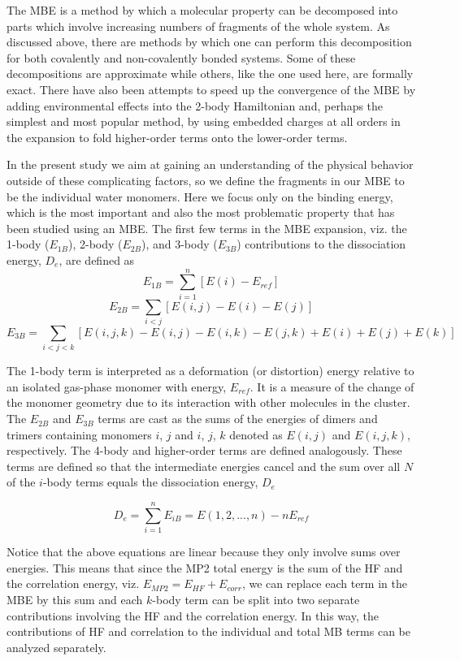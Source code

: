 \documentclass[11pt, proquest]{uwthesis}[2020/02/24]
\begin{document}
\par The MBE is a method by which a molecular property can be decomposed into parts which involve increasing numbers of fragments of the whole system. As discussed above, there are methods by which one can perform this decomposition for both covalently and non-covalently bonded systems. Some of these decompositions are approximate while others, like the one used here, are formally exact. There have also been attempts to speed up the convergence of the MBE by adding environmental effects into the 2-body Hamiltonian\autocite{gordon_effective_2001} and, perhaps the simplest and most popular method, by using embedded charges at all orders in the expansion to fold higher-order terms onto the lower-order terms.\autocite{dahlke_electrostatically_2007}

\par In the present study we aim at gaining an understanding of the physical behavior outside of these complicating factors, so we define the fragments in our MBE to be the individual water monomers. Here we focus only on the binding energy, which is the most important and also the most problematic property that has been studied using an MBE. The first few terms in the MBE expansion, viz. the 1-body ($E_{1B}$), 2-body ($E_{2B}$), and 3-body ($E_{3B}$) contributions to the dissociation energy, $D_e$, are defined as\autocite{hankins_hydrogen-bond_1970, xantheas_ab_1994}
$$
E_{1B}=\sum_{i=1}^n[E(i)-E_{ref}]
$$
$$
E_{2B}=\sum_{i<j}[E(i,j)-E(i)-E(j)]
$$
$$
E_{3B}=\sum_{i<j<k}[E(i,j,k)-E(i,j)-E(i,k)-E(j,k)+E(i)+E(j)+E(k)]
$$

The 1-body term is interpreted as a deformation (or distortion) energy\autocite{white_analysis_1990, xantheas_importance_1996} relative to an isolated gas-phase monomer with energy, $E_{ref}$. It is a measure of the change of the monomer geometry due to its interaction with other molecules in the cluster. The $E_{2B}$ and $E_{3B}$ terms are cast as the sums of the energies of dimers and trimers containing monomers $i$, $j$ and $i$, $j$, $k$ denoted as $E(i,j)$ and $E(i,j,k)$, respectively. The 4-body and higher-order terms are defined analogously. These terms are defined so that the intermediate energies cancel and the sum over all $N$ of the $i$-body terms equals the dissociation energy, $D_e$

$$
D_e=\sum_{i=1}^nE_{iB}=E(1,2,...,n)-nE_{ref}
$$

Notice that the above equations are linear because they only involve sums over energies. This means that since the MP2 total energy is the sum of the HF and the correlation energy, viz. $E_{MP2}=E_{HF}+E_{corr}$, we can replace each term in the MBE by this sum and each $k$-body term can be split into two separate contributions involving the HF and the correlation energy. In this way, the contributions of HF and correlation to the individual and total MB terms can be analyzed separately.
\end{document}
